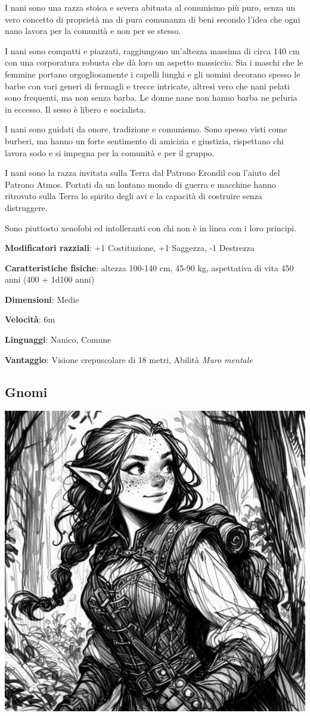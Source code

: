 \begin{multicols}{2}
I nani sono una razza stoica e severa abituata al comunismo più puro, senza un vero concetto di proprietà ma di pura comunanza di beni secondo l'idea che ogni nano lavora per la comunità e non per se stesso.

I nani sono compatti e piazzati, raggiungono un'altezza massima di circa 140 cm con una corporatura robusta che dà loro un aspetto massiccio. Sia i maschi che le femmine portano orgogliosamente i capelli lunghi e gli uomini decorano spesso le barbe con vari generi di fermagli e trecce intricate, altresì vero che nani pelati sono frequenti, ma non senza barba. Le donne nane non hanno barba ne peluria in eccesso. Il sesso è libero e socialista.

I nani sono guidati da onore, tradizione e comunismo. Sono spesso visti come burberi, ma hanno un forte sentimento di amicizia e giustizia, rispettano chi lavora sodo e si impegna per la comunità e per il gruppo.

I nani sono la razza invitata sulla Terra dal Patrono Erondil con l'aiuto del Patrono Atmos. Portati da un lontano mondo di guerra e macchine hanno ritrovato sulla Terra lo spirito degli avi e la capacità di costruire senza distruggere.

Sono piuttosto xenofobi ed intolleranti con chi non è in linea con i loro principi.

\textbf{Modificatori razziali}: +1 Costituzione, +1 Saggezza, -1 Destrezza

\textbf{Caratteristiche fisiche}: altezza 100-140 cm, 45-90 kg, aspettativa di vita 450 anni (400 + 1d100 anni)

\textbf{Dimensioni}: Medie

\textbf{Velocità}: 6m

\textbf{Linguaggi}: Nanico, Comune

\textbf{Vantaggio}: Visione crepuscolare di 18 metri, Abilità \emph{Muro mentale}

\subsection{Gnomi}\label{gnomi}


\begin{center}
\includegraphics[height=0.7\linewidth]{immagini/gnoma-ai.png}


\end{center}
\end{multicols}
